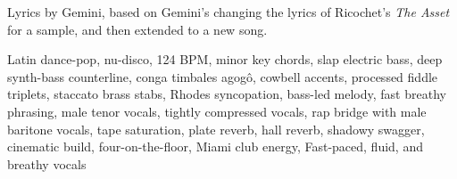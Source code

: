
\begin{notes}
Lyrics by Gemini, based on Gemini's changing the lyrics of Ricochet's \emph{The Asset} for a sample, and then extended to a new song.
\end{notes}
\begin{style}
Latin dance-pop, nu-disco, 124 BPM, minor key chords, slap electric bass, deep synth-bass counterline, conga timbales agogô, cowbell accents, processed fiddle triplets, staccato brass stabs, Rhodes syncopation, bass-led melody, fast breathy phrasing, male tenor vocals, tightly compressed vocals, rap bridge with male baritone vocals, tape saturation, plate reverb, hall reverb, shadowy swagger, cinematic build, four-on-the-floor, Miami club energy, Fast-paced, fluid, and breathy vocals
\end{style}
